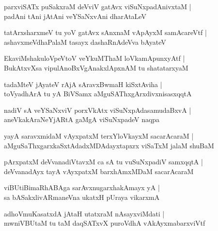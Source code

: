 \begin{shloka}
parxviSATx puSakxraM deVviV gatAvx viSuNxpadAnivxtaM |\\
padAni tAni jAtAni veYSaNxvAni dharAtaLeV
\end{shloka}

\begin{shloka}
tatArxsharxmeV tu yoV gatAvx sAnxnaM vApAyxM samAcareVtf |\\
ashavxmeVdhaPalaM tasayx dashaRnAdeVva bAyateV 
\end{shloka}

\begin{shloka}
EkaviMshakuloVpeVtoV veYkuMThaM loVkamApunxyAtf |\\
BukAtxvXsa vipulAnoBxVgAnakxlApxnAM tu shatatarxyaM 
\end{shloka}

\begin{shloka}
tadaMteV jAyateV rAjA sAravxBwmaH kiSxtAviha |\\
toVyadhArA tu yA BiVSamx aMguSAThxgArxdivxnisasxqqtA 
\end{shloka}

\begin{shloka}
nadiV sA veYSaNxviV porxVkAtx viSuNxpAdasamudaBxvA |\\
aneVkakAraNeYjARtA gaMgA viSuNxpadeV naqpa
\end{shloka}

\begin{shloka}
yayA saravxmidaM vAyxpatxM terxYloVkayxM sacarAcaraM |\\
aMguSaThxgarxkaSxtAdadxMDAdayxtapxrx viSaTxM jalaM shuBaM
\end{shloka}

\begin{shloka}
pArxpatxM deVvanadiVtavxM ca sA tu vuSuNxpadiV samxqqtA |\\
deVvanadAyx tayA vAyxpatxM barxhAmxMDaM sacarAcaraM
\end{shloka}

\begin{shloka}
viBUtiBimaRhABAga sarAvxnugarxhakAmayx yA |\\ sa bASakxlivARmaneVna ukatxH pUraya vikarxmA\R
\end{shloka}

\begin{shloka}
adhoVmuKasatxdA jAtaH utatxraM nAsayxviMdati |\\
mwniVBUtaM tu taM daqSATxvX puroVdhA vAkAyxmabarxviVtf 
\end{shloka}

